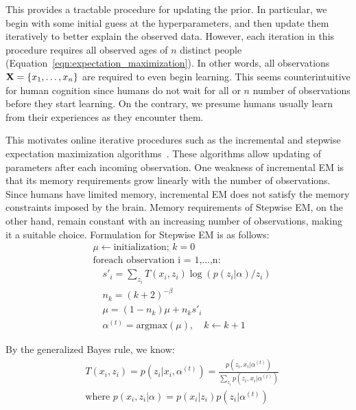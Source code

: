 \documentclass[10pt,letterpaper]{article}
\renewcommand{\vec}[1]{{\bf {#1}}}
\begin{document}
This provides a tractable procedure for updating the prior. In particular, we begin with some initial guess at the hyperparameters, and then update them iteratively to better explain the observed data. However, each iteration in this procedure requires all observed ages of $n$ distinct people (Equation~\ref{eqn:expectation_maximization}). In other words, all observations $\vec{X} = \{x_1, \ldots, x_n\}$ are required to even begin learning. This seems counterintuitive for human cognition since humans do not wait for all or $n$ number of observations before they start learning. On the contrary, we presume humans usually learn from their experiences as they encounter them. 

This motivates online iterative procedures such as the incremental and stepwise expectation maximization algorithms~\cite{liang2009online}. These algorithms allow updating of parameters after each incoming observation. One weakness of incremental EM is that its memory requirements grow linearly with the number of observations. Since humans have limited memory, incremental EM does not satisfy the memory constraints imposed by the brain. Memory requirements of Stepwise EM, on the other hand, remain constant with an increasing number of observations, making it a suitable choice. Formulation for Stepwise EM is as follows:
\begin{equation}
\label{eqn:onlineEM}
\begin{split}
& \mu \leftarrow \text{initialization; $k=0$}  \\
& \text{foreach observation i = 1,...,n}: \\
& \quad s'_{i} = \sum_{z_i} T(x_i, z_i) \log \left( p(z_i | \alpha) / z_i \right) \\
& \quad n_{k} = (k+2)^{-\beta} \\
& \quad \mu = (1-n_{k}) \mu + n_{k}s'_{i} \\
& \quad \alpha^{(t)} = \text{argmax}(\mu) , \quad \text{$k \leftarrow  k+1$}
\end{split}
\end{equation}

By the generalized Bayes rule, we know:
\begin{equation}
\begin{split}
\label{eqn:gb_likelihood}
& T(x_i, z_i) = p(z_i | x_i, \alpha^{(t)}) = \frac{p(z_i, x_i | \alpha^{(t)})}{ \sum_{z_i} p(z_i, x_i | \alpha^{(t)}) } \\
& \text{where } p(x_i, z_i | \alpha) = p(x_i | z_i) p(z_i | \alpha^{(t)}) \\
\end{split}
\end{equation}
\end{document}
